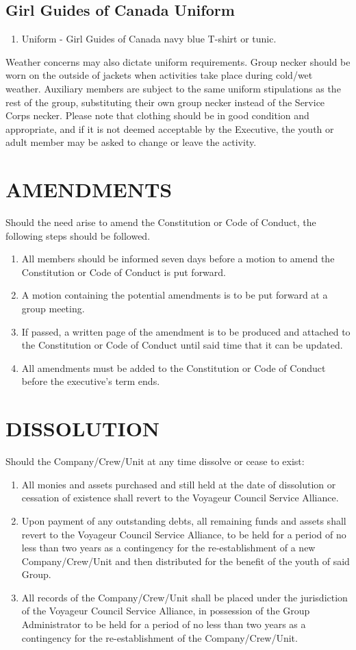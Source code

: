\documentclass{Service_Corps_Document}
\begin{document}
\subsection{Girl Guides of Canada Uniform}
\begin{enumerate}
	\item Uniform - Girl Guides of Canada navy blue T-shirt or tunic.
\end{enumerate}
Weather concerns may also dictate uniform requirements. Group necker should be worn on the outside of jackets when activities take place during cold/wet weather. Auxiliary members are subject to the same uniform stipulations as the rest of the group, substituting their own group necker instead of the Service Corps necker. 
Please note that clothing should be in good condition and appropriate, and if it is not deemed acceptable by the Executive, the youth or adult member may be asked to change or leave the activity.
\section{AMENDMENTS}
Should the need arise to amend the Constitution or Code of Conduct, the following steps should be followed. 
\begin{enumerate}
	\item All members should be informed seven days before a motion to amend the Constitution or Code of Conduct is put forward.
	\item A motion containing the potential amendments is to be put forward at a group meeting.
	\item If passed, a written page of the amendment is to be produced and attached to the Constitution or Code of Conduct until said time that it can be updated.
	\item All amendments must be added to the Constitution or Code of Conduct before the executive’s term ends.
\end{enumerate}
\section{DISSOLUTION}
Should the Company/Crew/Unit at any time dissolve or cease to exist: 
\begin{enumerate}
	\item All monies and assets purchased and still held at the date of dissolution or cessation of existence shall revert to the Voyageur Council Service Alliance.
	\item Upon payment of any outstanding debts, all remaining funds and assets shall revert to the Voyageur Council Service Alliance, to be held for a period of no less than two years as a contingency for the re-establishment of a new Company/Crew/Unit and then distributed for the benefit of the youth of said Group.
	\item All records of the Company/Crew/Unit shall be placed under the jurisdiction of the Voyageur Council Service Alliance, in possession of the Group Administrator to be held for a period of no less than two years as a contingency for the re-establishment of the Company/Crew/Unit. 
\end{enumerate}
\end{document}
